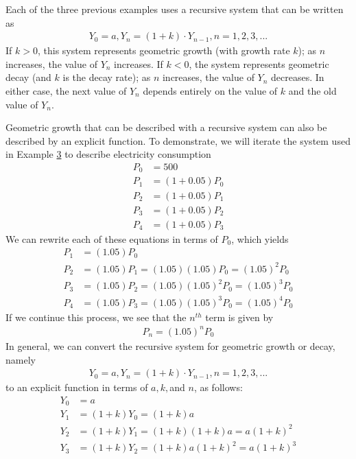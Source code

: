 \documentclass[10pt,]{book}
\theoremstyle{plain}
\theoremstyle{definition}
\theoremstyle{definition}
\theoremstyle{definition}
\numberwithin{equation}{section}
\newcommand{\lt}{<}
\newcommand{\gt}{>}
\begin{document}
\hypertarget{p-80}{}%
Each of the three previous examples uses a recursive system that can be written as%
%
\begin{gather*}
Y_0=a,Y_n=(1+k) \cdot Y_{n-1}, n=1,2,3, ...
\end{gather*}
\hypertarget{p-81}{}%
If \(k \gt 0\), this system represents geometric growth (with growth rate \(k\)); as \(n\) increases, the value of \(Y_n\)  increases.  If \(k \lt 0\), the system represents geometric decay (and \(k\) is the decay rate); as \(n\) increases, the value of \(Y_n\)  decreases.  In either case, the next value of \(Y_n\) depends entirely on the value of \(k\) and the old value of \(Y_n\).%
\par
\hypertarget{p-82}{}%
Geometric growth that can be described with a recursive system can also be described by an explicit function.  To demonstrate, we will iterate the system used in Example \hyperref[example-radioactive-decay]{3} to describe electricity consumption%
%
\begin{align*}
P_0&=500\\
P_1&=(1+0.05)P_0\\
P_2&=(1+0.05)P_1\\
P_3&=(1+0.05)P_2\\
P_4&=(1+0.05)P_3
\end{align*}
\hypertarget{p-83}{}%
We can rewrite each of these equations in terms of \(P_0\), which yields%
%
\begin{align*}
P_1&=(1.05)P_0\\
P_2&=(1.05) P_1=(1.05) (1.05)P_0=(1.05)^2 P_0\\
P_3&=(1.05) P_2=(1.05) (1.05)^2 P_0=(1.05)^3 P_0\\
P_4&=(1.05) P_3=(1.05) (1.05)^3 P_0=(1.05)^4 P_0
\end{align*}
\hypertarget{p-84}{}%
If we continue this process, we see that the \(n^{th}\) term is given by%
%
\begin{gather*}
P_n=(1.05)^n P_0
\end{gather*}
\hypertarget{p-85}{}%
In general, we can convert the recursive system for geometric growth or decay, namely%
%
\begin{gather*}
Y_0=a,Y_n=(1+k) \cdot Y_{n-1}, n=1,2,3, ...
\end{gather*}
\hypertarget{p-86}{}%
to an explicit function in terms of \(a, k, \)and \(n\), as follows:%
%
\begin{align*}
Y_0&=a\\
Y_1&=(1+k)Y_0 = (1+k)a\\
Y_2&=(1+k)Y_1 = (1+k)(1+k)a = a(1+k)^2\\
Y_3&=(1+k)Y_2 = (1+k)a(1+k)^2 = a(1+k)^3
\end{align*}
\end{document}
